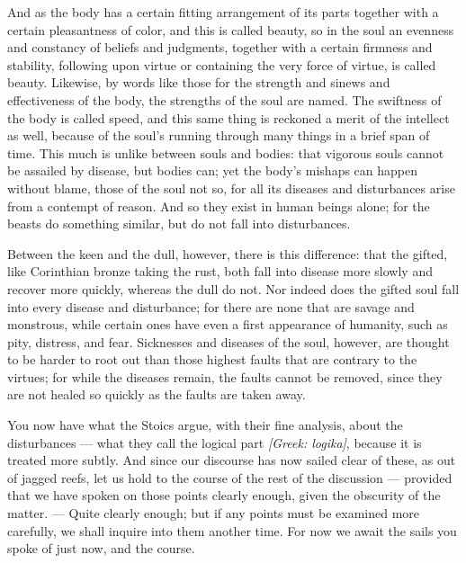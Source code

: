  And as the body has a certain fitting arrangement of its parts together with a certain pleasantness of color, and this is called beauty, so in the soul an evenness and constancy of beliefs and judgments, together with a certain firmness and stability, following upon virtue or containing the very force of virtue, is called beauty. Likewise, by words like those for the strength and sinews and effectiveness of the body, the strengths of the soul are named. The swiftness of the body is called speed, and this same thing is reckoned a merit of the intellect as well, because of the soul's running through many things in a brief span of time. This much is unlike between souls and bodies: that vigorous souls cannot be assailed by disease, but bodies can; yet the body's mishaps can happen without blame, those of the soul not so, for all its diseases and disturbances arise from a contempt of reason. And so they exist in human beings alone; for the beasts do something similar, but do not fall into disturbances.

 Between the keen and the dull, however, there is this difference: that the gifted, like Corinthian bronze taking the rust, both fall into disease more slowly and recover more quickly, whereas the dull do not. Nor indeed does the gifted soul fall into every disease and disturbance; for there are none that are savage and monstrous, while certain ones have even a first appearance of humanity, such as pity, distress, and fear. Sicknesses and diseases of the soul, however, are thought to be harder to root out than those highest faults that are contrary to the virtues; for while the diseases remain, the faults cannot be removed, since they are not healed so quickly as the faults are taken away.

 You now have what the Stoics argue, with their fine analysis, about the disturbances — what they call the logical part \textit{[Greek: logika]}, because it is treated more subtly. And since our discourse has now sailed clear of these, as out of jagged reefs, let us hold to the course of the rest of the discussion — provided that we have spoken on those points clearly enough, given the obscurity of the matter. — Quite clearly enough; but if any points must be examined more carefully, we shall inquire into them another time. For now we await the sails you spoke of just now, and the course.

